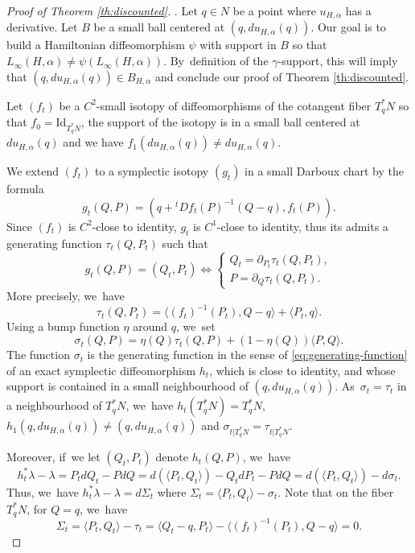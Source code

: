 \documentclass[JEP,XML,SOM,Unicode,NoFloatCountersInSection,published]{cedram}
\theoremstyle{definition}
\begin{document}
\begin{proof}[Proof of Theorem \ref{th:discounted}]. Let $q\in N$ be a point where $u_{H, \alpha}$ has a derivative. Let $B$ be a small ball centered at $(q, du_{H, \alpha}(q))$. Our goal is to build a Hamiltonian diffeomorphism $\psi$ with support in $B$ so that $L_\infty(H, \alpha)\neq\psi(L_\infty(H, \alpha))$. By~definition of the $\gamma$\nobreakdash-support, this will imply that $(q, du_{H, \alpha}(q))\in B_{H, \alpha}$ and conclude our proof of Theorem \ref{th:discounted}.

Let $(f_t)$ be a $C^2$-small isotopy of diffeomorphisms of the cotangent fiber $T^*_qN$ so that $f_0=\text{Id}_{T^*_qN}$, the support of the isotopy is in a small ball centered at $du_{H, \alpha}(q)$ and we have $f_1(du_{H, \alpha}(q))\neq du_{H,\alpha}(q)$.

We extend $(f_t)$ to a symplectic isotopy $(g_t)$ in a small Darboux chart by the formula
\[
g_t(Q, P)=(q+{}^tDf_t(P)^{-1}(Q-q), f_t(P)).
\]
Since $(f_t)$ is $C^2$-close to identity, $g_t$ is $C^1$-close to identity, thus its admits a generating function $\tau_t(Q, P_t)$ such that
\begin{equation} \label{eq:generating-function} g_t(Q, P)=(Q_t, P_t)\Longleftrightarrow
\begin{cases}
Q_t=\partial_{P_t}\tau_t(Q, P_t),\\ P=\partial_Q\tau_t(Q, P_t).
\end{cases}
\end{equation}
More precisely, we~have
\[
\tau_t(Q, P_t)=\langle (f_t)^{-1}(P_t), Q-q\rangle+\langle P_t,q\rangle.
\]
Using a bump function $\eta$ around $q$, we~set
\[
\sigma_t(Q, P)=\eta(Q)\tau_t(Q, P)+(1-\eta (Q))\langle P,Q\rangle.
\]
The function $\sigma_t$ is the generating function in the sense of \eqref{eq:generating-function} of an exact symplectic diffeomorphism $h_t$, which is close to identity, and whose support is contained in a small neighbourhood of $(q, du_{H, \alpha}(q))$. As~$\sigma_t=\tau_t$ in a neighbourhood of $T^*_qN$, we~have $h_t(T^*_qN)=T^*_qN$, $h_1(q, du_{H, \alpha}(q))\neq (q, du_{H, \alpha}(q))$ and $\sigma_{t|T^*_qN}=\tau_{t|T^*_qN}$.

Moreover, if~we let $(Q_t, P_t)$ denote $h_t(Q, P)$, we~have
\[
h_t^*\lambda-\lambda=P_tdQ_t-PdQ=d(\langle P_t,Q_t\rangle)-Q_tdP_t-PdQ=d(\langle P_t,Q_t\rangle)-d\sigma_t.
\]
Thus, we~have $h_t^*\lambda-\lambda=d\Sigma_t$ where $\Sigma_t=\langle P_t,Q_t\rangle-\sigma_t$.
Note that on the fiber $T_q^*N$, \ie for $Q=q$, we~have
\[
\Sigma_t
=\langle P_t,Q_t\rangle-\tau_t=\langle Q_t-q, P_t\rangle-\langle (f_t)^{-1}(P_t), Q-q\rangle=0.
\]


\end{proof}
\end{document}
